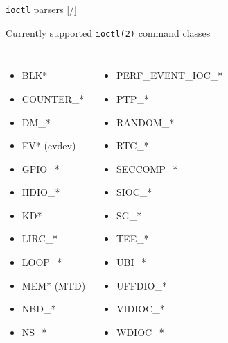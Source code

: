 \documentclass[unicode,aspectratio=169,xcolor={table,dvipsnames,usernames}]{beamer}
\begin{document}
\begin{frame}[fragile]{\texttt{ioctl} parsers \hfill [\insertframenumber/\inserttotalframenumber]}
\begin{block}{\large Currently supported \texttt{ioctl(2)} command classes}
\begin{columns}
	\column{6cm}
		\begin{itemize}
			\item BLK*
			\item COUNTER\_*
			\item DM\_*
			\item EV* (evdev)
			\item GPIO\_*
			\item HDIO\_*
			\item KD*
			\item LIRC\_*
			\item LOOP\_*
			\item MEM* (MTD)
			\item NBD\_*
			\item NS\_*
		\end{itemize}
	\column{6cm}
		\begin{itemize}
			\item PERF\_EVENT\_IOC\_*
			\item PTP\_*
			\item RANDOM\_*
			\item RTC\_*
			\item SECCOMP\_*
			\item SIOC\_*
			\item SG\_*
			\item TEE\_*
			\item UBI\_*
			\item UFFDIO\_*
			\item VIDIOC\_*
			\item WDIOC\_*
		\end{itemize}
\end{columns}
\end{block}
\end{frame}
\end{document}
